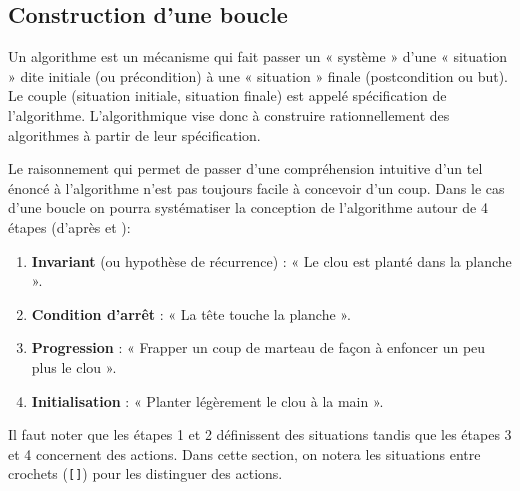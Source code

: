 \subsection{Construction d'une boucle}
Un algorithme est un mécanisme qui fait passer un « système » d'une « situation »
dite initiale (ou précondition) à une « situation » finale (postcondition ou but). 
Le couple (situation initiale, situation finale) est appelé spécification de l'algorithme. 
L'algorithmique vise donc à construire rationnellement des algorithmes à partir de 
leur spécification.

Le raisonnement qui permet de passer d'une compréhension intuitive d'un
tel énoncé à l'algorithme n'est pas toujours facile à concevoir d'un coup. 
Dans le cas d'une boucle on pourra systématiser la conception de l'algorithme
autour de 4 étapes (d'après \cite{didier} et \cite{guyomard}):
\begin{enumerate}
\item {\bf Invariant} (ou hypothèse de récurrence) : « Le clou est planté dans la planche ».
\item {\bf Condition d'arrêt} : « La tête touche la planche ».
\item {\bf Progression} : « Frapper un coup de marteau de façon à enfoncer un peu plus le clou ».
\item {\bf Initialisation} : « Planter légèrement le clou à la main ».
\end{enumerate}
Il faut noter que les étapes 1 et 2 définissent des situations
tandis que les étapes 3 et 4 concernent des actions. 
Dans cette section, on notera les situations entre crochets ({\tt []}) pour les distinguer
des actions.
